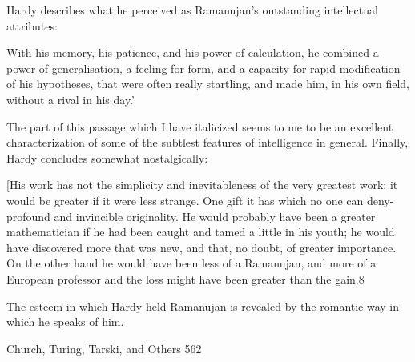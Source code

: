 {Hardy describes what he perceived as Ramanujan's outstanding intellectual attributes:

  With his memory, his patience, and his power of calculation, he combined a power
  of generalisation, a feeling for form, and a capacity for rapid modification of his
  hypotheses, that were often really startling, and made him, in his own field, without a
  rival in his day.'

The part of this passage which I have italicized seems to me to be an excellent
characterization of some of the subtlest features of intelligence in general. Finally, Hardy
concludes somewhat nostalgically:

  [His work has not the simplicity and inevitableness of the very greatest work; it
  would be greater if it were less strange. One gift it has which no one can deny-
  profound and invincible originality. He would probably have been a greater
  mathematician if he had been caught and tamed a little in his youth; he would have
  discovered more that was new, and that, no doubt, of greater importance. On the
  other hand he would have been less of a Ramanujan, and more of a European
  professor and the loss might have been greater than the gain.8

The esteem in which Hardy held Ramanujan is revealed by the romantic way in which he
speaks of him.


Church, Turing, Tarski, and Others                                                      562

}
